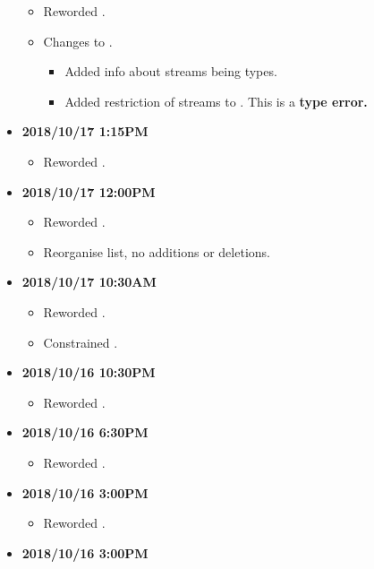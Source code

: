 \documentclass[../gazprea.tex]{subfiles}
\begin{document}
\begin{itemize}
\begin{itemize}
      \item Reworded .
      \item Changes to .
      \begin{itemize}
        \item Added info about streams being types.
        \item Added restriction of streams to .
          This is a \textbf{type error.}
      \end{itemize}
    \end{itemize}
  \item
    \textbf{2018/10/17 1:15PM}
    \begin{itemize}
      \item Reworded .
    \end{itemize}
  \item
    \textbf{2018/10/17 12:00PM}
    \begin{itemize}
      \item Reworded .
      \item Reorganise  list, no additions or deletions.
    \end{itemize}
  \item
    \textbf{2018/10/17 10:30AM}
    \begin{itemize}
      \item Reworded .
      \item Constrained  .
    \end{itemize}
  \item
    \textbf{2018/10/16 10:30PM}
    \begin{itemize}
      \item Reworded .
    \end{itemize}
  \item
    \textbf{2018/10/16 6:30PM}
    \begin{itemize}
      \item Reworded .
    \end{itemize}
  \item
    \textbf{2018/10/16 3:00PM}
    \begin{itemize}
      \item Reworded .
    \end{itemize}
  \item
    \textbf{2018/10/16 3:00PM}
    \begin{itemize}

\end{itemize}
\end{itemize}
\end{document}
